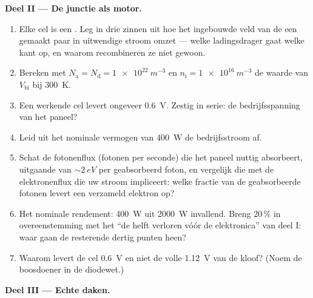 \begin{problem}
\medskip\noindent\textbf{Deel II --- De junctie als motor.}

\begin{enumerate}[resume]
  \item Elke cel is een . Leg in drie zinnen uit
        hoe het ingebouwde veld van de  een gemaakt
        paar in uitwendige stroom omzet --- welke ladingsdrager gaat welke
        kant op, en waarom recombineren ze niet gewoon.
  \item Bereken met $N_{\text{a}} = N_{\text{d}} = \qty{1e22}{m^{-3}}$
        en $n_{\text{i}} = \qty{1e16}{m^{-3}}$ de waarde van
        $V_{\text{bi}}$ bij \qty{300}{K}.
  \item Een werkende cel levert ongeveer \qty{0.6}{V}. Zestig in
        serie: de bedrijfsspanning van het paneel?
  \item Leid uit het nominale vermogen van \qty{400}{W} de bedrijfsstroom
        af.
  \item Schat de fotonenflux (fotonen per seconde) die het paneel
        nuttig absorbeert, uitgaande van $\sim\qty{2}{eV}$ per geabsorbeerd
        foton, en vergelijk die met de elektronenflux die uw stroom
        impliceert: welke fractie van de geabsorbeerde fotonen levert een
        verzameld elektron op?
  \item Het nominale rendement: \qty{400}{W} uit
        \qty{2000}{W} invallend. Breng 20\,\% in overeenstemming met het
        ``de helft verloren vóór de elektronica'' van deel I: waar gaan de resterende
        dertig punten heen?
  \item Waarom levert de cel \qty{0.6}{V} en niet de volle
        \qty{1.12}{V} van de kloof? (Noem de boosdoener in de
        diodewet.)
\end{enumerate}

\medskip\noindent\textbf{Deel III --- Echte daken.}


\end{problem}
